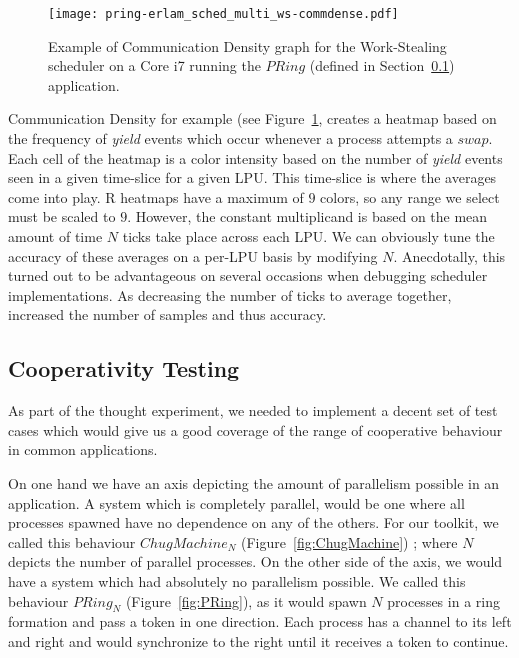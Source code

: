 \begin{figure}
\centering
\texttt{[image: pring-erlam\_sched\_multi\_ws-commdense.pdf]}
\caption{ Example of Communication Density graph for the Work-Stealing scheduler 
on a Core i7 running the $PRing$ (defined in Section~\ref{sec:cooperativity testing})
application.}
\label{fig:commdense-example}
\end{figure}

Communication Density for example (see Figure~\ref{fig:commdense-example}, 
creates a heatmap based on the frequency of
\emph{yield} events which occur whenever a process attempts a $swap$. Each cell
of the heatmap is a color intensity based on the number of \emph{yield} events 
seen in a given time-slice for a given LPU. This time-slice is where the averages
come into play. R heatmaps have a maximum of $9$ colors, so any range we 
select must be scaled to $9$. However, the constant multiplicand is based on the
mean amount of time $N$ ticks take place across each LPU.
We can obviously tune the accuracy of these averages on a per-LPU basis by
modifying $N$. Anecdotally, this turned out to be advantageous on several 
occasions when debugging scheduler implementations. As decreasing the number of
ticks to average together, increased the number of samples and thus accuracy.

\subsection{Cooperativity Testing}\label{sec:cooperativity testing}

As part of the thought experiment, we needed to implement a decent set of test 
cases which would give us a good coverage of the range of cooperative behaviour
in common applications. 

On one hand we have an axis depicting the amount of parallelism possible in an 
application. A system which is completely parallel, would be one where all 
processes spawned have no dependence on any of the others. For our toolkit, we 
called this behaviour $ChugMachine_N$ (Figure~\ref{fig:ChugMachine}) ; where $N$ depicts the number of parallel 
processes. On the other side of the axis, we would have a system which had 
absolutely no parallelism possible. We called this behaviour $PRing_N$ (Figure~\ref{fig:PRing}), as it
would spawn $N$ processes in a ring formation and pass a token in one direction.
Each process has a channel to its left and right and would synchronize to the 
right until it receives a token to continue. 

